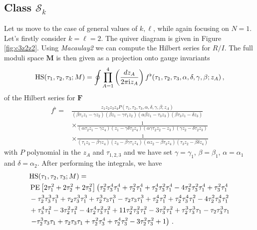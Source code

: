 \documentclass[main.tex]{subfiles}
\begin{document}
\subsection{Class \texorpdfstring{$\mathcal{S}_k$}{Sk}}
Let us move to the case of general values of $k,\ell$, while again focusing on $N=1$. 
Let's firstly consider $k=\ell=2$. The quiver diagram is given in Figure \ref{fig:c3z2z2}.
Using \textit{Macaulay2} we can compute the Hilbert series for $R/I$. The full moduli space $\mathbf{M}$ is then given as a projection onto gauge invariants
\begin{equation}
\textrm{HS}(\tau_1,\tau_2,\tau_3;M)=\oint\prod_{A=1}^4\left(\frac{dz_A}{2\pi\mathrm{i} z_A}\right)f^{\flat}(\tau_1,\tau_2,\tau_3,\alpha,\delta,\gamma,\beta;z_A)\,,
\end{equation}
of the Hilbert series for $\mathbf{F}$
\begin{equation}
\begin{aligned}f^{\flat}=&\frac{z_1z_2z_3z_4P(\tau_1,\tau_2,\tau_3,\alpha,\delta,\gamma,\beta;z_A)}{\left(\beta  \tau _1 z_1-\gamma  z_2\right) \left(\beta  z_1-\gamma  \tau _1 z_2\right) \left(\alpha  \beta  z_1-\tau _3 z_3\right) \left(\beta  \tau _3
   z_1-\delta  z_3\right) }\\
   &\times\frac{1}{ \left(\alpha  \tau _2 z_1-\gamma  z_4\right) \left(z_1-\gamma  \delta  \tau _2 z_4\right) \left(\alpha  \gamma  \tau _2
   z_2-z_3\right) \left(\gamma  z_2-\delta  \tau _2 z_3\right)}\\
   &\times\frac{1}{ \left(\tau _1 z_3-\beta  \gamma z_4\right) \left(z_3-\beta  \gamma  \tau _1 z_4\right)\left(\alpha z_2-\beta  \tau _3 z_4\right) \left(\tau _3 z_2-\beta  \delta  z_4\right)}
 \end{aligned}
\end{equation}
with $P$ polynomial in the $z_A$ and $\tau_{1,2,3}$ and we have set $\gamma=\gamma_1$, $\beta=\beta_1$, $\alpha=\alpha_1$ and $\delta=\alpha_2$. After performing the integrals, we have
\begin{equation}
\begin{aligned}
&\textrm{HS}(\tau_1,\tau_2,\tau_3;M)=\\&\operatorname{\mathrm{PE}}\left[2\tau^2_1+2\tau^2_2+2\tau^2_3\right]\left(\tau _2^2 \tau _3^4 \tau _1^4+\tau _2^2 \tau _1^4+\tau _2^4 \tau _3^2 \tau _1^4-4 \tau _2^2 \tau _3^2 \tau _1^4+\tau _3^2 \tau _1^4\right.\\
&-\tau _2^3 \tau _3^3 \tau _1^3+\tau _2 \tau _3^3 \tau _1^3+\tau
   _2^3 \tau _3 \tau _1^3-\tau _2 \tau _3 \tau _1^3+\tau _2^4 \tau _1^2+\tau _2^4 \tau _3^4 \tau _1^2-4 \tau _2^2 \tau _3^4 \tau _1^2\\
   &+\tau _3^4 \tau _1^2-3 \tau _2^2 \tau _1^2-4 \tau _2^4 \tau _3^2
   \tau _1^2+11 \tau _2^2 \tau _3^2 \tau _1^2-3 \tau _3^2 \tau _1^2+\tau _2^3 \tau _3^3 \tau _1-\tau _2 \tau _3^3 \tau _1\\
   &\left.-\tau _2^3 \tau _3 \tau _1+\tau _2 \tau _3 \tau _1+\tau _2^2 \tau _3^4+\tau _2^4
   \tau _3^2-3 \tau _2^2 \tau _3^2+1\right)\,.
\end{aligned}
\end{equation}
\end{document}

